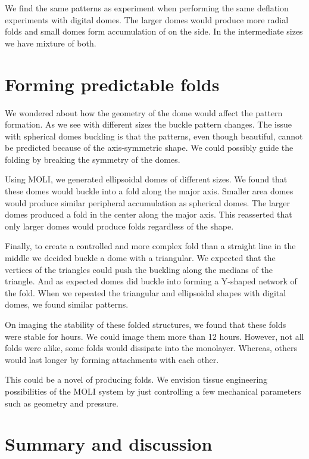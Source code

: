 We find the same patterns as experiment when performing the same
deflation experiments with digital domes. The larger domes would produce
more radial folds and small domes form accumulation of on the side. In
the intermediate sizes we have mixture of both.

\hypertarget{forming-predictable-folds}{%
\section{Forming predictable folds}\label{forming-predictable-folds}}

We wondered about how the geometry of the dome would affect the pattern
formation. As we see with different sizes the buckle pattern changes.
The issue with spherical domes buckling is that the patterns, even
though beautiful, cannot be predicted because of the axis-symmetric
shape. We could possibly guide the folding by breaking the symmetry of
the domes.

Using MOLI, we generated ellipsoidal domes of different sizes. We found
that these domes would buckle into a fold along the major axis. Smaller
area domes would produce similar peripheral accumulation as spherical
domes. The larger domes produced a fold in the center along the major
axis. This reasserted that only larger domes would produce folds
regardless of the shape.

Finally, to create a controlled and more complex fold than a straight
line in the middle we decided buckle a dome with a triangular. We
expected that the vertices of the triangles could push the buckling
along the medians of the triangle. And as expected domes did buckle into
forming a Y-shaped network of the fold. When we repeated the triangular
and ellipsoidal shapes with digital domes, we found similar patterns.

On imaging the stability of these folded structures, we found that these
folds were stable for hours. We could image them more than 12 hours.
However, not all folds were alike, some folds would dissipate into the
monolayer. Whereas, others would last longer by forming attachments with
each other.

This could be a novel of producing folds. We envision tissue engineering
possibilities of the MOLI system by just controlling a few mechanical
parameters such as geometry and pressure.

\newpage
\hypertarget{summary-and-discussion}{%
\section{Summary and discussion}\label{summary-and-discussion}}

